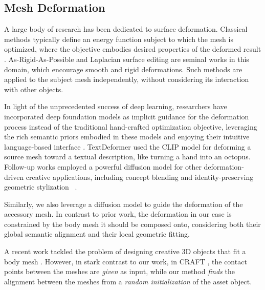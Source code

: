 \subsection{Mesh Deformation}
A large body of research has been dedicated to surface deformation. Classical methods typically define an energy function subject to which the mesh is optimized, where the objective embodies desired properties of the deformed result \cite{yu2004poisson,botschsorkine08deformsurvey,skinningcourse:2014,Fulton:LSD:2018}. As-Rigid-As-Possible \cite{sorkine2007rigid} and Laplacian surface editing \cite{sorkine2004laplacian} are seminal works in this domain, which encourage smooth and rigid deformations. Such methods are applied to the subject mesh independently, without considering its interaction with other objects. 


In light of the unprecedented success of deep learning, researchers have incorporated deep foundation models as implicit guidance for the deformation process instead of the traditional hand-crafted optimization objective, leveraging the rich semantic priors embodied in these models and enjoying their intuitive language-based interface \cite{michel2022text2mesh,xu2024fusiondeformer,yang2024dreammesh,chen2024textmeshrefine}. TextDeformer \cite{michel2022text2mesh} used the CLIP model for deforming a source mesh toward a textual description, like turning a hand into an octopus. Follow-up works employed a powerful diffusion model for other deformation-driven creative applications, including concept blending \cite{kim2025meshup} and identity-preserving geometric stylization~ \cite{dinh2025geometry}. 

Similarly, we also leverage a diffusion model to guide the deformation of the accessory mesh. In contrast to prior work, the deformation in our case is constrained by the body mesh it should be composed onto, considering both their global semantic alignment and their local geometric fitting.

A recent work tackled the problem of designing creative 3D objects that fit a body mesh \cite{guo2025craft}. However, in stark contrast to our work, in CRAFT \cite{guo2025craft}, the contact points between the meshes are \textit{given} as input, while our method \textit{finds} the alignment between the meshes from a \textit{random initialization} of the asset object. 

